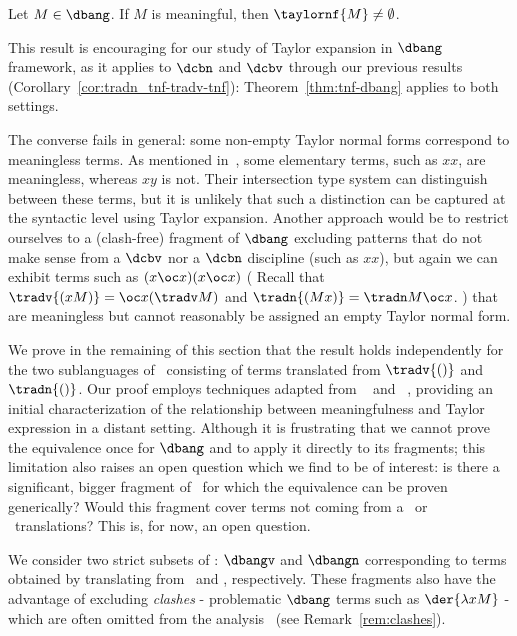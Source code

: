 \begin{theorem}\label{thm:tnf-dbang}
	Let $M\in\dbang$. If $M$ is meaningful, then $\taylornf{M}\neq
	\emptyset$.
\end{theorem}


This result is encouraging for our study of Taylor expansion in $\dbang$
framework, as it applies to $\dcbn$ and $\dcbv$ through our previous 
results (Corollary~\ref{cor:tradn_tnf-tradv-tnf}): 
Theorem~\ref{thm:tnf-dbang} applies to both settings.

The converse fails in general: some non-empty Taylor normal forms correspond to
meaningless terms. As mentioned in~\cite{kag24}, some elementary terms, such as
$xx$, are meaningless, whereas $xy$ is not. Their intersection type system can
distinguish between these terms, but it is unlikely that such a distinction can
be captured at the syntactic level using Taylor expansion. 
%
Another approach would be to restrict ourselves to a (clash-free) fragment of
$\dbang$ excluding patterns that do not make sense from a $\dcbv$ nor a $\dcbn$
discipline (such as $xx$), but again we can exhibit terms such as $(x\oc x)(x\oc
x)$ (
	Recall that $\tradv{(xM)}=\oc x(\tradv M)$ and $\tradn{(Mx)}=\tradn M
	\oc x$.
) that are meaningless but cannot reasonably be assigned an empty Taylor normal
form. 

We prove in the remaining of this section that the result holds independently
for the two sublanguages of \dbang\ consisting of terms translated from
$\tradv{()}$ and $\tradn{()}$.
%
Our proof employs techniques adapted from \cbn{}~\cite{ER08} and
\cbv~\cite{CG14}, providing an initial characterization of the relationship between meaningfulness and Taylor
expression in a distant setting. Although it is frustrating that we cannot prove
the equivalence once for $\dbang$ and to apply it directly to its fragments;
this limitation 
also raises an open question which we find to be of interest: is there a
significant, bigger fragment of \dbang\ for which the equivalence can be proven
generically? Would this fragment cover terms not coming from a \dcbv\ or \dcbn\
translations? This is, for now, an open question.

We consider two strict subsets of \dbang : $\dbangv$ and $\dbangn$ corresponding
to terms obtained by translating from \dcbn\ and \dcbv, respectively. These
fragments also have the advantage of excluding 
\emph{clashes} - problematic $\dbang$ terms such as $\der{\lambda xM}$ - 
which are often omitted from the analysis~\cite{bucciarelli2023bang,
ehrhard2016bang} (see Remark~\ref{rem:clashes}).

